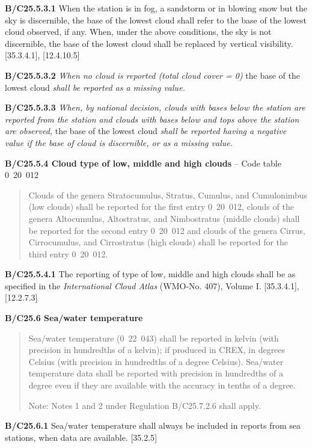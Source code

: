 \textbf{B/C25.5.3.1} When the station is in fog, a sandstorm or in blowing snow but the sky is discernible, the base of the lowest cloud shall refer to the base of the lowest cloud observed, if any. When, under the above conditions, the sky is not discernible, the base of the lowest cloud shall be replaced by vertical visibility. {[}35.3.4.1{]}, {[}12.4.10.5{]}

\textbf{B/C25.5.3.2} \emph{When no cloud is reported (total cloud cover = 0)} the base of the lowest cloud \emph{shall be reported as a missing value.}

\textbf{B/C25.5.3.3} \emph{When, by national decision, clouds with bases below the station are reported from the station and clouds with bases below and tops above the station are observed,} the base of the lowest cloud \emph{shall be reported having a negative value if the base of cloud is discernible, or as a missing value.}

\textbf{B/C25.5.4 Cloud type of low, middle and high clouds} -- Code table 0~20~012

\begin{quote}
Clouds of the genera Stratocumulus, Stratus, Cumulus, and Cumulonimbus (low clouds) shall be reported for the first entry 0~20~012, clouds of the genera Altocumulus, Altostratus, and Nimbostratus (middle clouds) shall be reported for the second entry 0~20~012 and clouds of the genera Cirrus, Cirrocumulus, and Cirrostratus (high clouds) shall be reported for the third entry 0~20~012.
\end{quote}

\textbf{B/C25.5.4.1} The reporting of type of low, middle and high clouds shall be as specified in the \emph{International Cloud Atlas} (WMO-No. 407), Volume I. {[}35.3.4.1{]}, {[}12.2.7.3{]}

\textbf{B/C25.6 Sea/water temperature}

\begin{quote}
Sea/water temperature (0~22~043) shall be reported in kelvin (with precision in hundredths of a kelvin); if produced in CREX, in degrees Celsius (with precision in hundredths of a degree Celsius). Sea/water temperature data shall be reported with precision in hundredths of a degree even if they are available with the accuracy in tenths of a degree.

Note: Notes 1 and 2 under Regulation B/C25.7.2.6 shall apply.
\end{quote}

\textbf{B/C25.6.1} Sea/water temperature shall always be included in reports from sea stations, when data are available. {[}35.2.5{]}

